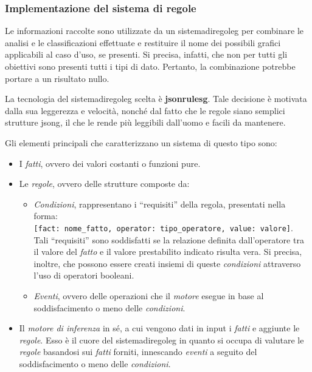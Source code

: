 \subsubsection{Implementazione del sistema di regole}\label{subsubsec:rules}
Le informazioni raccolte sono utilizzate da un \gls{sistemadiregoleg} per combinare le analisi e le classificazioni effettuate e restituire il nome dei possibili grafici applicabili al caso d'uso, se presenti.
Si precisa, infatti, che non per tutti gli obiettivi sono presenti tutti i tipi di dato. Pertanto, la combinazione potrebbe portare a un risultato nullo.

La tecnologia del \gls{sistemadiregoleg} scelta è \textbf{\gls{jsonrulesg}}. Tale decisione è motivata dalla sua leggerezza e velocità, nonché dal fatto che le regole siano semplici strutture \gls{jsong}, 
il che le rende più leggibili dall'uomo e facili da mantenere.

\bigskip
\noindent Gli elementi principali che caratterizzano un sistema di questo tipo sono:
\begin{itemize}
    \item I \emph{fatti}, ovvero dei valori costanti o funzioni pure.
    \item Le \emph{regole}, ovvero delle strutture composte da:
    \begin{itemize}
        \item \emph{Condizioni}, rappresentano i ``requisiti'' della regola, presentati nella forma:\\
        \texttt{[fact: nome\_fatto, operator: tipo\_operatore, value: valore]}. \\
        Tali ``requisiti'' sono soddisfatti se la relazione definita dall'operatore tra il valore del \emph{fatto} e il valore prestabilito 
        indicato risulta vera. Si precisa, inoltre, che possono essere creati insiemi di queste \emph{condizioni} attraverso l'uso di operatori booleani.
        \item \emph{Eventi}, ovvero delle operazioni che il \emph{motore} esegue in base al soddisfacimento o meno delle \emph{condizioni}. 
    \end{itemize}
    \item Il \emph{motore di inferenza} in sé, a cui vengono dati in input i \emph{fatti} e aggiunte le \emph{regole}. Esso è il cuore del \gls{sistemadiregoleg} in quanto si occupa di valutare
    le \emph{regole} basandosi sui \emph{fatti} forniti, innescando \emph{eventi} a seguito del soddisfacimento o meno delle \emph{condizioni}.
\end{itemize}

